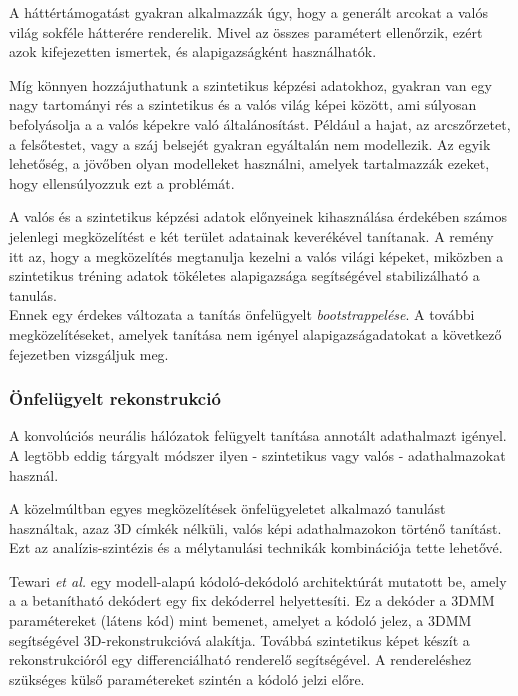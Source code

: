 \documentclass[12pt,a4]{article}
\begin{document}
	
	A háttértámogatást gyakran alkalmazzák úgy, hogy a generált arcokat a valós világ sokféle hátterére renderelik. Mivel az összes paramétert ellenőrzik, ezért azok kifejezetten ismertek, és alapigazságként használhatók.
	
	
	Míg könnyen hozzájuthatunk a szintetikus képzési adatokhoz, gyakran van egy nagy tartományi rés
	a szintetikus és a valós világ képei között, ami súlyosan befolyásolja a
	a valós képekre való általánosítást. Például a hajat, az arcszőrzetet, a felsőtestet,
	vagy a száj belsejét gyakran egyáltalán nem modellezik. Az egyik lehetőség,
	a jövőben olyan modelleket használni, amelyek tartalmazzák ezeket, hogy ellensúlyozzuk ezt a problémát. 
	
	
	A valós és a szintetikus képzési adatok előnyeinek kihasználása érdekében számos jelenlegi megközelítést e két terület adatainak keverékével tanítanak. A remény itt az, hogy a megközelítés megtanulja kezelni a valós világi
	képeket, miközben a szintetikus tréning adatok tökéletes alapigazsága
	segítségével stabilizálható a tanulás.\\


	Ennek egy érdekes változata
	a tanítás önfelügyelt \textit{bootstrappelése}. A további megközelítéseket, amelyek tanítása nem igényel
	alapigazságadatokat a következő fejezetben vizsgáljuk meg.
	
	\subsubsection{Önfelügyelt rekonstrukció}
	A konvolúciós neurális hálózatok felügyelt tanítása annotált adathalmazt igényel. A legtöbb
	eddig tárgyalt módszer ilyen - szintetikus vagy valós - adathalmazokat használ.
	
	\cite{3dmm}
	A közelmúltban egyes megközelítések önfelügyeletet alkalmazó
	tanulást használtak, azaz 3D címkék nélküli, valós képi adathalmazokon történő tanítást.
	Ezt az analízis-szintézis és a mélytanulási technikák kombinációja tette lehetővé.
	
	
	Tewari \textit{et al.} \cite{tewari} egy modell-alapú kódoló-dekódoló architektúrát mutatott be, amely a
	a betanítható dekódert egy fix dekóderrel helyettesíti. Ez a dekóder a 3DMM paramétereket (látens kód)
	mint bemenet, amelyet a kódoló jelez, a 3DMM segítségével 3D-rekonstrukcióvá alakítja.
	Továbbá szintetikus képet készít a rekonstrukcióról egy differenciálható renderelő segítségével.
	A rendereléshez szükséges külső paramétereket szintén a kódoló jelzi előre. 
	
\end{document}
